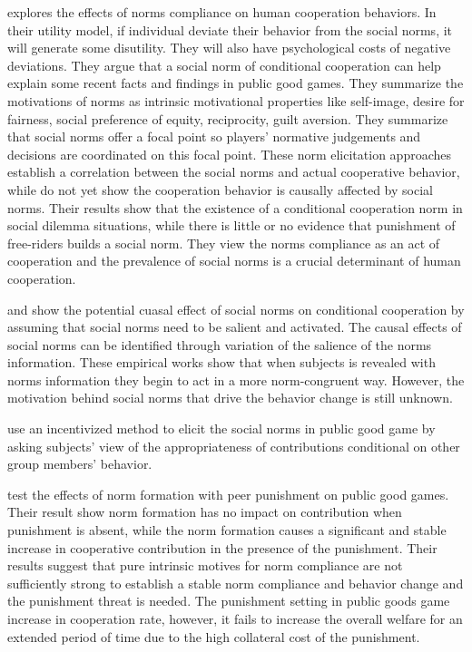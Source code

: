 \documentclass{article}
\begin{document}
\cite{fehr2018normative} explores the effects of norms compliance on human cooperation behaviors. In their utility model, if individual deviate their behavior from the social norms, it will generate some disutility. They will also have psychological costs of negative deviations. They argue that a social norm of conditional cooperation can help explain some recent facts and findings in public good games. They summarize the motivations of norms as intrinsic motivational properties like self-image, desire for fairness, social preference of equity, reciprocity, guilt aversion. They summarize that social norms offer a focal point so players' normative judgements and decisions are coordinated on this focal point. These norm elicitation approaches establish a correlation between the social norms and actual cooperative behavior, while do not yet show the cooperation behavior is causally affected by social norms. Their results show that the existence of a conditional cooperation norm in social dilemma situations, while there is little or no evidence that punishment of free-riders builds a social norm.  They view the norms compliance as an act of cooperation and the prevalence of social norms is a crucial determinant of human cooperation. 

\cite{cialdini1991focus} and \cite{kallgren2000focus} show the potential cuasal effect of social norms on conditional cooperation by assuming that social norms need to be salient and activated. The causal effects of social norms can be identified through variation of the salience of the norms information. These empirical works show that when subjects is revealed with norms information they begin to act in a more norm-congruent way. However, the motivation behind social norms that drive the behavior change is still unknown. 

\cite{kimbrough2016norms} use an incentivized method to elicit the social norms in public good game by asking subjects' view of the appropriateness of contributions conditional on other group members' behavior. 

\cite{fehr2018dynamics} test the effects of norm formation with peer punishment on public good games. Their result show norm formation has no impact on contribution when punishment is absent, while the norm formation causes a significant and stable increase in cooperative contribution in the presence of the punishment. Their results suggest that pure intrinsic motives for norm compliance are not sufficiently strong to establish a stable norm compliance and behavior change and the punishment threat is needed. The punishment setting in public goods game increase in cooperation rate, however, it fails to increase the overall welfare for an extended period of time due to the high collateral cost of the punishment. 
\end{document}
